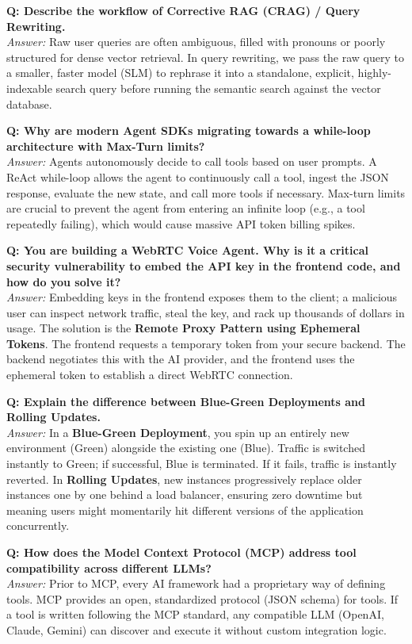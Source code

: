 \documentclass[12pt,a4paper,oneside]{book}
\begin{document}
\textbf{Q: Describe the workflow of Corrective RAG (CRAG) / Query Rewriting.} \\
\textit{Answer:} Raw user queries are often ambiguous, filled with pronouns or poorly structured for dense vector retrieval. In query rewriting, we pass the raw query to a smaller, faster model (SLM) to rephrase it into a standalone, explicit, highly-indexable search query before running the semantic search against the vector database.

\textbf{Q: Why are modern Agent SDKs migrating towards a while-loop architecture with Max-Turn limits?} \\
\textit{Answer:} Agents autonomously decide to call tools based on user prompts. A ReAct while-loop allows the agent to continuously call a tool, ingest the JSON response, evaluate the new state, and call more tools if necessary. Max-turn limits are crucial to prevent the agent from entering an infinite loop (e.g., a tool repeatedly failing), which would cause massive API token billing spikes.

\textbf{Q: You are building a WebRTC Voice Agent. Why is it a critical security vulnerability to embed the API key in the frontend code, and how do you solve it?} \\
\textit{Answer:} Embedding keys in the frontend exposes them to the client; a malicious user can inspect network traffic, steal the key, and rack up thousands of dollars in usage. The solution is the \textbf{Remote Proxy Pattern using Ephemeral Tokens}. The frontend requests a temporary token from your secure backend. The backend negotiates this with the AI provider, and the frontend uses the ephemeral token to establish a direct WebRTC connection.

\textbf{Q: Explain the difference between Blue-Green Deployments and Rolling Updates.} \\
\textit{Answer:} In a \textbf{Blue-Green Deployment}, you spin up an entirely new environment (Green) alongside the existing one (Blue). Traffic is switched instantly to Green; if successful, Blue is terminated. If it fails, traffic is instantly reverted. In \textbf{Rolling Updates}, new instances progressively replace older instances one by one behind a load balancer, ensuring zero downtime but meaning users might momentarily hit different versions of the application concurrently.

\textbf{Q: How does the Model Context Protocol (MCP) address tool compatibility across different LLMs?} \\
\textit{Answer:} Prior to MCP, every AI framework had a proprietary way of defining tools. MCP provides an open, standardized protocol (JSON schema) for tools. If a tool is written following the MCP standard, any compatible LLM (OpenAI, Claude, Gemini) can discover and execute it without custom integration logic.
\end{document}
